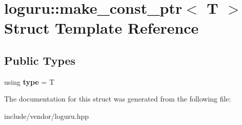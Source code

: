 \hypertarget{structloguru_1_1make__const__ptr}{}\section{loguru\+:\+:make\+\_\+const\+\_\+ptr$<$ T $>$ Struct Template Reference}
\label{structloguru_1_1make__const__ptr}
\subsection*{Public Types}
\begin{DoxyCompactItemize}
\item 
\mbox{\label{structloguru_1_1make__const__ptr_a6df15eb9978d84a3436a2ee6691081a4}} 
using {\bfseries type} = T
\end{DoxyCompactItemize}


The documentation for this struct was generated from the following file\+:\begin{DoxyCompactItemize}
\item 
include/vendor/loguru.\+hpp\end{DoxyCompactItemize}
